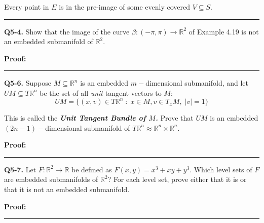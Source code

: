\documentclass{article}
\newcommand{\R}{\mathbb{R}}
\begin{document}
\vskip 0.5cm
Every point in $E$ is in the pre-image of some evenly covered $V \subseteq S$.

\vskip 0.5cm
\hrule 
\vskip 0.5cm




\textbf{Q5-4.} Show that the image of the curve $\beta : (-\pi, \pi) \rightarrow \R^2$ of Example 4.19 is not an embedded submanifold of $\R^2$. 

\vskip 0.5cm
\textbf{Proof:}


\vskip 0.5cm
\hrule 
\vskip 0.5cm




\textbf{Q5-6.} Suppose $M \subseteq \R^n$ is an embedded $m-$dimensional submanifold, and let $UM \subseteq T \R^n$ be the set of all \emph{unit} tangent vectors to $M$:
\[ UM = \{ (x, v) \in T \R^n \; : \; x\in M, v \in T_{x} M, \; \left| v \right| = 1 \} \]

This is called the \emph{\textbf{Unit Tangent Bundle of $M$.}} Prove that $UM$ is an embedded  $(2n-1)-$dimensional submanifold of $T \R^n \approx \R^n \times \R^{n}$.

\vskip 0.5cm
\textbf{Proof:}


\vskip 0.5cm
\hrule 
\vskip 0.5cm




\textbf{Q5-7.} Let $F : \R^2 \rightarrow \R$ be defined as $F(x,y) = x^3 + xy + y^3$. Which level sets of $F$ are embedded submanifolds of $\R^2$? For each level set, prove either that it is or that it is not an embedded submanifold. 

\vskip 0.5cm
\textbf{Proof:}


\vskip 0.5cm
\hrule 
\vskip 0.5cm









\end{document}
